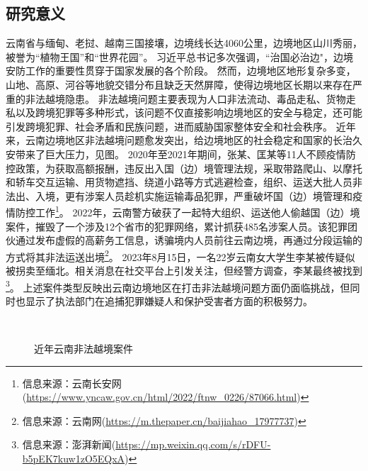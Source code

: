 \subsection{研究意义}

云南省与缅甸、老挝、越南三国接壤，边境线长达4060公里，边境地区山川秀丽，被誉为“植物王国”和“世界花园”。
习近平总书记多次强调，``治国必治边"，边境安防工作的重要性贯穿于国家发展的各个阶段。
然而，边境地区地形复杂多变，山地、高原、河谷等地貌交错分布且缺乏天然屏障，使得边境地区长期以来存在严重的非法越境隐患。
非法越境问题主要表现为人口非法流动、毒品走私、货物走私以及跨境犯罪等多种形式，该问题不仅直接影响边境地区的安全与稳定，还可能引发跨境犯罪、社会矛盾和民族问题，进而威胁国家整体安全和社会秩序。
近年来，云南边境地区非法越境问题愈发突出，给边境地区的社会稳定和国家的长治久安带来了巨大压力，见图。
2020年至2021年期间，张某、匡某等11人不顾疫情防控政策，为获取高额报酬，违反出入国（边）境管理法规，采取带路爬山、以摩托和轿车交互运输、用货物遮挡、绕道小路等方式逃避检查，组织、运送大批人员非法出、入境，更有涉案人员趁机实施运输毒品犯罪，严重破坏国（边）境管理和疫情防控工作\footnote{信息来源：云南长安网(\url{https://www.yncaw.gov.cn/html/2022/ftnw_0226/87066.html})}。
2022年，云南警方破获了一起特大组织、运送他人偷越国（边）境案件，摧毁了一个涉及12个省市的犯罪网络，累计抓获485名涉案人员。该犯罪团伙通过发布虚假的高薪务工信息，诱骗境内人员前往云南边境，再通过分段运输的方式将其非法运送出境\footnote{信息来源：云南网(\url{https://m.thepaper.cn/baijiahao_17977737})}。
2023年8月15日，一名22岁云南女大学生李某被传疑似被拐卖至缅北。相关消息在社交平台上引发关注，但经警方调查，李某最终被找到\footnote{信息来源：澎湃新闻(\url{https://mp.weixin.qq.com/s/rDFU-b5pEK7kuw1zO5EQxA})}。
上述案件类型反映出云南边境地区在打击非法越境问题方面仍面临挑战，但同时也显示了执法部门在追捕犯罪嫌疑人和保护受害者方面的积极努力。

\begin{figure}[h!]
\centering %
\subfloat[``1·24"非法越境案件]{
	\texttt{[image: 1]}
}
\subfloat[2022特大非法越境案件]{
	\texttt{[image: 2]}
}\\
\captionsetup{justification=centering} %
\caption{近年云南非法越境案件}
\label{fig:case-}
\end{figure}

